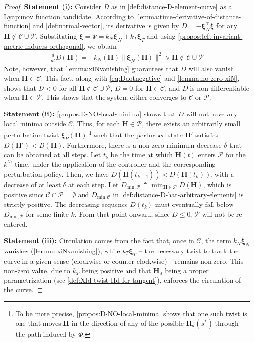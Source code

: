\begin{proof}
    \textbf{Statement (i):} Consider $D$ as in \cref{def:distance-D-element-curve} as a Lyapunov function candidate. According to \cref{lemma:time-derivative-of-distance-function} and \cref{def:normal-vector}, its derivative is given by $\dot{D} = -\boldsymbol{\xi}_N^{\top}\boldsymbol{\xi} $ for any $\mathbf{H} \notin \mathcal{C} \cup \mathcal{P}$. Substituting $\boldsymbol{\xi}=\Psi=k_N\boldsymbol{\xi}_N+k_T\boldsymbol{\xi}_T$ and using \cref{propos:left-invariant-metric-induces-orthogonal}, we obtain 
\begin{align}
\label{eq:Ddotnegative}
    \frac{d}{dt}D(\mathbf{H})= -k_N(\mathbf{H})\|\boldsymbol{\xi}_N(\mathbf{H})\|^2 \;\forall\;\mathbf{H} \notin \mathcal{C} \cup \mathcal{P}
\end{align}
Note, however, that \cref{lemma:xiNvanishing} guarantees that $\dot{D}$ will also vanish when $\mathbf{H} \in \mathcal{C}$. This fact, along with \eqref{eq:Ddotnegative} and \cref{lemma:no-zero-xiN}, shows that $\dot{D} < 0$ for all $\mathbf{H} \not \in \mathcal{C} \cup \mathcal{P}$, $\dot{D} = 0$ for $\mathbf{H} \in \mathcal{C}$, and $D$ is non-differentiable when $\mathbf{H} \in \mathcal{P}$. This shows that the system either converges to $\mathcal{C}$ or $\mathcal{P}$.

\textbf{Statement (ii):} \cref{propos:D-NO-local-minima} shows that $D$ will not have any local minima outside $\mathcal{C}$. Thus, for each $\mathbf{H} \in \mathcal{P}$, there exists an arbitrarily small perturbation twist $\boldsymbol{\xi}_P(\mathbf{H})$ \footnote{To be more precise, \cref{propos:D-NO-local-minima} shows that one such twist is one that moves $\mathbf{H}$ in the direction of any of the possible $\mathbf{H}_d(s^*)$ through the path induced by $\Phi$.} such that the perturbed state $\mathbf{H}'$ satisfies $D(\mathbf{H}') < D(\mathbf{H})$. Furthermore, there is a non-zero minimum decrease $\delta$ that can be obtained at all steps. Let $t_k$ be the time at which $\mathbf{H}(t)$ enters $\mathcal{P}$ for the $k^{th}$ time, under the application of the controller and the corresponding perturbation policy. Then, we have $D(\mathbf{H}(t_{k+1})) < D(\mathbf{H}(t_k))$, with a decrease of at least $\delta$ at each step. Let $D_{\text{min}, \mathcal{P}} \triangleq \min_{\mathbf{H} \in \mathcal{P}} D(\mathbf{H})$, which is positive since $\mathcal{C} \cap \mathcal{P} = \emptyset$ and $D_{\text{min},\mathcal{C}}$ in \cref{def:distance-D-hat-arbitrary-elements} is strictly positive. The decreasing sequence $D(t_k)$ must eventually fall below $D_{\text{min}, \mathcal{P}}$ for some finite $k$. From that point onward, since $\dot{D} \leq 0$, $\mathcal{P}$ will not be re-entered.

\textbf{Statement (iii):} Circulation comes from the fact that, once in $\mathcal{C}$, the term $k_N \boldsymbol{\xi}_N$ vanishes (\cref{lemma:xiNvanishing}), while $k_T \boldsymbol{\xi}_T$ -- the necessary twist to track the curve in a given sense (clockwise or counter-clockwise) -- remains non-zero. This non-zero value, due to $k_T$ being positive and that $\mathbf{H}_d$ being a proper parametrization (see \cref{def:XId-twist-Hd-for-tangent}), enforces the circulation of the curve.
\end{proof} 
